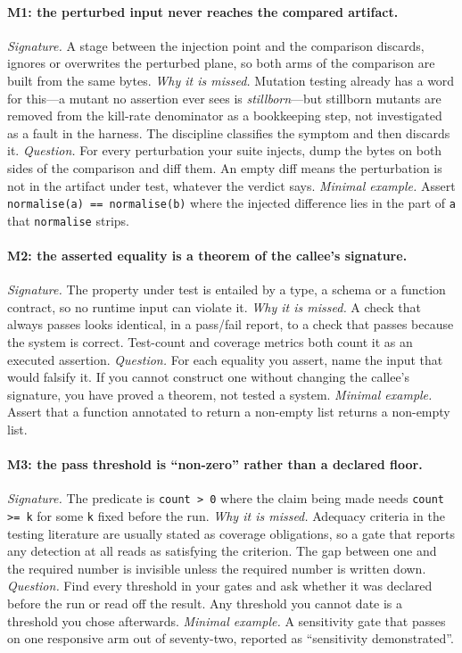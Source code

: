 \documentclass[11pt]{article}
\begin{document}
\paragraph{M1: the perturbed input never reaches the compared artifact.}
\emph{Signature.} A stage between the injection point and the comparison discards, ignores or overwrites the perturbed plane, so both arms of the comparison are built from the same bytes.
\emph{Why it is missed.} Mutation testing already has a word for this---a mutant no assertion ever sees is \emph{stillborn}---but stillborn mutants are removed from the kill-rate denominator as a bookkeeping step, not investigated as a fault in the harness. The discipline classifies the symptom and then discards it.
\emph{Question.} For every perturbation your suite injects, dump the bytes on both sides of the comparison and diff them. An empty diff means the perturbation is not in the artifact under test, whatever the verdict says.
\emph{Minimal example.} Assert \texttt{normalise(a) == normalise(b)} where the injected difference lies in the part of \texttt{a} that \texttt{normalise} strips.

\paragraph{M2: the asserted equality is a theorem of the callee's signature.}
\emph{Signature.} The property under test is entailed by a type, a schema or a function contract, so no runtime input can violate it.
\emph{Why it is missed.} A check that always passes looks identical, in a pass/fail report, to a check that passes because the system is correct. Test-count and coverage metrics both count it as an executed assertion.
\emph{Question.} For each equality you assert, name the input that would falsify it. If you cannot construct one without changing the callee's signature, you have proved a theorem, not tested a system.
\emph{Minimal example.} Assert that a function annotated to return a non-empty list returns a non-empty list.

\paragraph{M3: the pass threshold is ``non-zero'' rather than a declared floor.}
\emph{Signature.} The predicate is \texttt{count > 0} where the claim being made needs \texttt{count >= k} for some \texttt{k} fixed before the run.
\emph{Why it is missed.} Adequacy criteria in the testing literature are usually stated as coverage obligations, so a gate that reports any detection at all reads as satisfying the criterion. The gap between one and the required number is invisible unless the required number is written down.
\emph{Question.} Find every threshold in your gates and ask whether it was declared before the run or read off the result. Any threshold you cannot date is a threshold you chose afterwards.
\emph{Minimal example.} A sensitivity gate that passes on one responsive arm out of seventy-two, reported as ``sensitivity demonstrated''.
\end{document}
